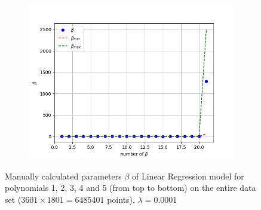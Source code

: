 \begin{figure}[!ht]
\begin{subfigure}{\textwidth}
\end{subfigure}
\begin{subfigure}{\textwidth}
  \centering
\includegraphics[width=0.5\linewidth]{images/real/real_ridge_beta_p05_nreal.png}
\end{subfigure}
\caption{Manually calculated parameters $\beta$ of Linear Regression model for polynomials 1, 2, 3, 4 and 5 (from top to bottom) on the entire data set ($3601\times1801 = 6485401$ points). $\lambda=0.0001$}
\label{fig:ridge-beta-real}
\end{figure}

